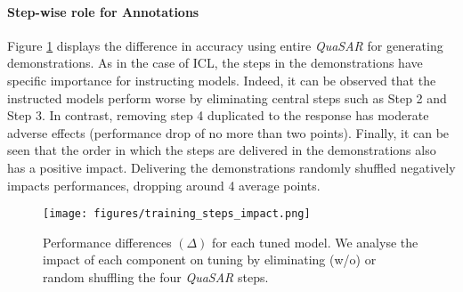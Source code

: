 \documentclass[11pt]{article}
\newcommand{\QuaSAR}{\emph{QuaSAR}\xspace}
\begin{document}
\paragraph{Step-wise role for Annotations}
Figure \ref{fig:missing_steps_performances} displays the difference in accuracy using entire \QuaSAR for generating demonstrations. As in the case of ICL, the steps in the demonstrations have specific importance for instructing models. Indeed, it can be observed that the instructed models perform worse by eliminating central steps such as Step 2 and Step 3. In contrast, removing step 4 duplicated to the response has moderate adverse effects (performance drop of no more than two points). Finally, it can be seen that the order in which the steps are delivered in the demonstrations also has a positive impact. Delivering the demonstrations randomly shuffled negatively impacts performances, dropping around 4 average points.

\begin{figure}[h]
    \centering
    \texttt{[image: figures/training\_steps\_impact.png]}
    \caption{Performance differences $(\Delta)$ for each tuned model. We analyse the impact of each component on tuning by eliminating (w/o) or random shuffling the four \QuaSAR steps.
    }
\label{fig:missing_steps_performances}
\end{figure}
\end{document}
